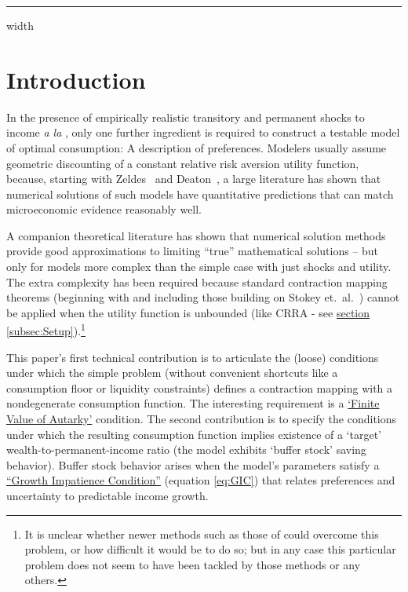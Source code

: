 \documentclass[BufferStockTheory]{subfiles}
\begin{document}

\hrule height 0.4pt depth 0.0pt width \textwidth \relax

\medskip \medskip

\hypertarget{Introduction}{}
\section{Introduction}

\label{sec:intro}

In the presence of empirically realistic transitory and permanent shocks to income \textit{a la} \cite{friedmanATheory}, only one further ingredient is required to construct a testable model of optimal consumption: A description of preferences.  Modelers usually assume geometric discounting of a constant relative risk aversion utility function, because, starting with Zeldes~\citeyearpar{zeldesStochastic} and Deaton~\citeyearpar{deatonLiqConstr}, a large literature has shown that numerical solutions of such models have quantitative predictions that can match microeconomic evidence reasonably well.

A companion theoretical literature has shown that numerical solution methods provide good approximations to limiting ``true'' mathematical solutions -- but only for models more complex than the simple case with just shocks and utility.  The extra complexity has been required because standard contraction mapping theorems (beginning with \cite{bellmanDynamicProgramming} and including those building on Stokey et.~al.~\citeyearpar{slpMethods}) cannot be applied when the utility function is unbounded (like CRRA - see \hyperlink{DiffFromLit}{section \ref{subsec:Setup}}).\footnote{It is unclear whether newer methods such as those of \cite{mnUnique} could overcome this problem, or how difficult it would be to do so; but in any case this particular problem does not seem to have been tackled by those methods or any others.}

This paper's first technical contribution is to articulate the (loose) conditions under which the simple problem (without convenient shortcuts like a consumption floor or liquidity constraints) defines a contraction mapping with a nondegenerate consumption function.  The interesting requirement is a \hyperlink{FVAC}{`Finite Value of Autarky'} condition.  The second contribution is to specify the conditions under which the resulting consumption function implies existence of a `target' wealth-to-permanent-income ratio (the model exhibits `buffer stock' saving behavior).  Buffer stock behavior arises when the model's parameters satisfy a \hyperlink{GIC}{``Growth Impatience Condition''} (equation \eqref{eq:GIC}) that relates preferences and uncertainty to predictable income growth.
\end{document}
